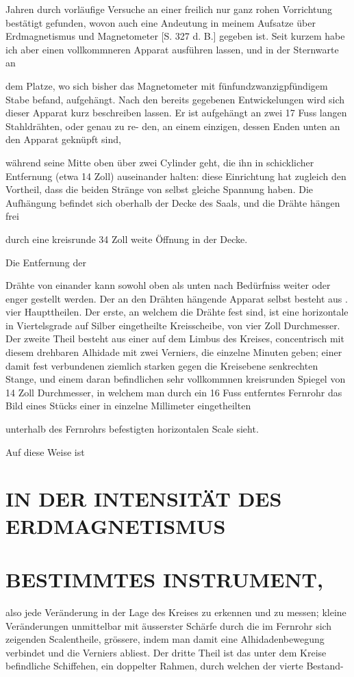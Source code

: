 \documentclass[12pt,a4paper]{article}
\begin{document}
Jahren durch vorläufige Versuche an einer freilich nur ganz rohen Vorrichtung bestätigt gefunden, wovon auch eine Andeutung in meinem Aufsatze über Erdmagnetismus und Magnetometer [S. 327 d. B.] gegeben ist. Seit kurzem habe ich aber einen vollkommneren Apparat ausführen lassen, und in der Sternwarte an

dem Platze, wo sich bisher das Magnetometer mit fünfundzwanzigpfündigem Stabe befand, aufgehängt. Nach den bereits gegebenen Entwickelungen wird sich dieser Apparat kurz beschreiben lassen. Er ist aufgehängt an zwei 17 Fuss langen Stahldrähten, oder genau zu re- den, an einem einzigen, dessen Enden unten an den Apparat geknüpft sind,

während seine Mitte oben über zwei Cylinder geht, die ihn in schicklicher Entfernung (etwa 14 Zoll) auseinander halten: diese Einrichtung hat zugleich den Vortheil, dass die beiden Stränge von selbst gleiche Spannung haben. Die Aufhängung befindet sich oberhalb der Decke des Saals, und die Drähte hängen frei

durch eine kreisrunde 34 Zoll weite Öffnung in der Decke.

Die Entfernung der

Drähte von einander kann sowohl oben als unten nach Bedürfniss weiter oder enger gestellt werden. Der an den Drähten hängende Apparat selbst besteht aus . vier Haupttheilen. Der erste, an welchem die Drähte fest sind, ist eine horizontale in Viertelsgrade auf Silber eingetheilte Kreisscheibe, von vier Zoll Durchmesser. Der zweite Theil besteht aus einer auf dem Limbus des Kreises, concentrisch mit diesem drehbaren Alhidade mit zwei Verniers, die einzelne Minuten geben; einer damit fest verbundenen ziemlich starken gegen die Kreisebene senkrechten Stange, und einem daran befindlichen sehr vollkommnen kreisrunden Spiegel von 14 Zoll Durchmesser, in welchem man durch ein 16 Fuss entferntes Fernrohr das Bild eines Stücks einer in einzelne Millimeter eingetheilten

unterhalb des Fernrohrs befestigten horizontalen Scale sieht.

Auf diese Weise ist

\section*{IN DER INTENSITÄT DES ERDMAGNETISMUS}
\section*{BESTIMMTES INSTRUMENT,}
also jede Veränderung in der Lage des Kreises zu erkennen und zu messen; kleine Veränderungen unmittelbar mit äusserster Schärfe durch die im Fernrohr sich zeigenden Scalentheile, grössere, indem man damit eine Alhidadenbewegung verbindet und die Verniers abliest. Der dritte Theil ist das unter dem Kreise befindliche Schiffehen, ein doppelter Rahmen, durch welchen der vierte Bestand-
\end{document}
